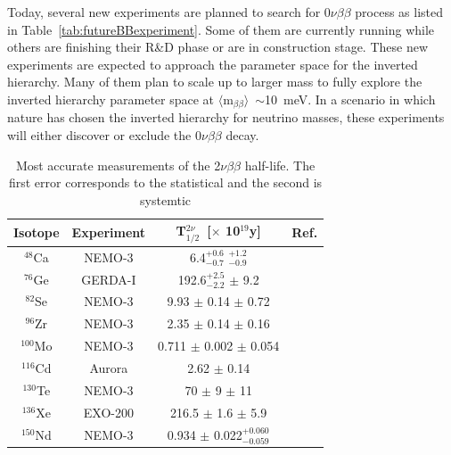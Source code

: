 \documentclass[main.tex]{subfiles}
\begin{document}
\bigskip


\NI Today, several new experiments are planned to search for 0$\nu\beta\beta$ process as listed in Table~\ref{tab:futureBBexperiment}. Some of them are currently running while others are finishing their R\&D phase or are in construction stage. These new experiments are expected to approach the parameter space for the inverted hierarchy. Many of them plan to scale up to larger mass to fully explore the inverted hierarchy parameter space at $ \langle \text{m}_{\beta\beta} \rangle$~$\sim$10~meV. In a scenario in which nature has chosen the inverted hierarchy for neutrino masses, these experiments will either discover or exclude the 0$\nu\beta\beta$ decay.


\begin{table}[h!]
\centering
\begin{tabular}{cccc}
\toprule
Isotope & Experiment & T$_{\text{1/2}}^{\text{2}\nu}$~[$\times$ 10$^{\text{19}}$y]& Ref. \\
\midrule
$^{\text{48}}$Ca  & NEMO-3  & 6.4$^{+\text{0.6}}_{-\text{0.7}}$ $^{+\text{1.2}}_{-\text{0.9}}$ & \cite{NEMO3:Ca48} \\[0.1cm]
$^{\text{76}}$Ge  & GERDA-I & 192.6$^{+\text{2.5}}_{-\text{2.2}}$ $\pm$ 9.2 & \cite{Gerda2nubb} \\[0.1cm]
$^{\text{82}}$Se  & NEMO-3  & 9.93 $\pm$ 0.14 $\pm$ 0.72 & \cite{ThesisJMott} \\[0.1cm]
$^{\text{96}}$Zr  & NEMO-3  & 2.35 $\pm$ 0.14 $\pm$ 0.16 & \cite{NEMO3:Zr96} \\[0.1cm]
$^{\text{100}}$Mo & NEMO-3  & 0.711 $\pm$ 0.002 $\pm$ 0.054 & \cite{NEMO3:Mo100-pre} \\[0.1cm]
$^{\text{116}}$Cd & Aurora  & 2.62 $\pm$ 0.14     & \cite{AuroraRecent} \\[0.1cm]
$^{\text{130}}$Te & NEMO-3  & 70 $\pm$ 9 $\pm$ 11 & \cite{NEMO3:Te130} \\[0.1cm]
$^{\text{136}}$Xe & EXO-200 & 216.5 $\pm$ 1.6 $\pm$ 5.9 & \cite{EXO-200-2nubb} \\[0.1cm]
$^{\text{150}}$Nd & NEMO-3  & 0.934 $\pm$ 0.022$^{+\text{0.060}}_{-\text{0.059}}$  & \cite{NEMO3:Nd150} \\
\bottomrule
\end{tabular}
\caption{Most accurate measurements of the 2$\nu\beta\beta$ half-life. The first error corresponds to the statistical and the second is systemtic}
\label{tab:summaryBB2NUmeasurements}
\end{table}
\end{document}

